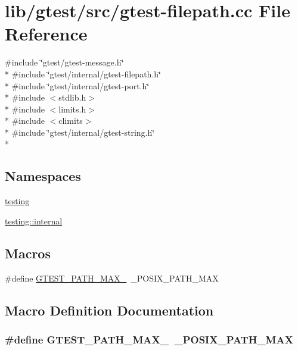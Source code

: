 \hypertarget{gtest-filepath_8cc}{\section{lib/gtest/src/gtest-\/filepath.cc File Reference}
\label{gtest-filepath_8cc}
}
{\ttfamily \#include \char`\"{}gtest/gtest-\/message.\-h\char`\"{}}\\*
{\ttfamily \#include \char`\"{}gtest/internal/gtest-\/filepath.\-h\char`\"{}}\\*
{\ttfamily \#include \char`\"{}gtest/internal/gtest-\/port.\-h\char`\"{}}\\*
{\ttfamily \#include $<$stdlib.\-h$>$}\\*
{\ttfamily \#include $<$limits.\-h$>$}\\*
{\ttfamily \#include $<$climits$>$}\\*
{\ttfamily \#include \char`\"{}gtest/internal/gtest-\/string.\-h\char`\"{}}\\*
\subsection*{Namespaces}
\begin{DoxyCompactItemize}
\item 
\hyperlink{namespacetesting}{testing}
\item 
\hyperlink{namespacetesting_1_1internal}{testing\-::internal}
\end{DoxyCompactItemize}
\subsection*{Macros}
\begin{DoxyCompactItemize}
\item 
\#define \hyperlink{gtest-filepath_8cc_ad9d445747785a9271a57cf1d392b89ad}{G\-T\-E\-S\-T\-\_\-\-P\-A\-T\-H\-\_\-\-M\-A\-X\-\_\-}~\-\_\-\-P\-O\-S\-I\-X\-\_\-\-P\-A\-T\-H\-\_\-\-M\-A\-X
\end{DoxyCompactItemize}


\subsection{Macro Definition Documentation}
\hypertarget{gtest-filepath_8cc_ad9d445747785a9271a57cf1d392b89ad}{
\subsubsection[{G\-T\-E\-S\-T\-\_\-\-P\-A\-T\-H\-\_\-\-M\-A\-X\-\_\-}]{\setlength{\rightskip}{0pt plus 5cm}\#define G\-T\-E\-S\-T\-\_\-\-P\-A\-T\-H\-\_\-\-M\-A\-X\-\_\-~\-\_\-\-P\-O\-S\-I\-X\-\_\-\-P\-A\-T\-H\-\_\-\-M\-A\-X}}\label{gtest-filepath_8cc_ad9d445747785a9271a57cf1d392b89ad}
